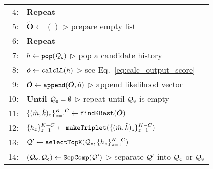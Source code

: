 \documentclass[11pt]{article}
\begin{document}
\begin{figure}[t]
\begin{tabular}{rp{71mm}}
      \\
  4:&\hspace{0.0em}
      \textbf{Repeat} \\
  5:&\hspace{3.0mm}
      $\tilde{\bm{O}} \leftarrow () $
      \hspace{\fill}$\triangleright$ {\scriptsize prepare empty list}
      \\
  6:&\hspace{3.0mm}
      \textbf{Repeat} \\
  7:&\hspace{6.0mm}
      $h \leftarrow {\tt pop}({\cal Q}_{\tt w})$
      \hspace{\fill}$\triangleright$ {\scriptsize pop a candidate history}
      \\
  8:&\hspace{6.0mm}
      $\tilde{\bm{o}} \leftarrow {\tt calcLL}(h)$
      \hspace{\fill}$\triangleright$ {\scriptsize see Eq.~\ref{eq:calc_output_score} }
      \\
  9:&\hspace{6.0mm}
      $\tilde{\bm{O}} \leftarrow {\tt append}(\tilde{\bm{O}},\tilde{\bm{o}})$
      \hspace{\fill}$\triangleright$ {\scriptsize append likelihood vector}
      \\
  10:&\hspace{3.0mm}
      \textbf{Until} ${\cal Q}_{\tt w} = \emptyset$
      \hspace{\fill}$\triangleright$ {\scriptsize repeat until ${\cal Q}_{\tt w}$ is empty}
      \\
  11:&\hspace{3.0mm}
      $\{(\hat{m},\hat{k})_{z}\}^{K-C}_{z=1} \leftarrow {\tt findKBest}(\tilde{\bm{O}})$
      \\
  12:&\hspace{3.0mm}
      $\{h_{z}\}^{K-C}_{z=1} \leftarrow {\tt makeTriplet}(\{(\hat{m},\hat{k})_{z}\}_{z=1}^{K-C} ) $
      \\
  13:&\hspace{3.0mm}
      ${\cal Q}' \leftarrow {\tt selectTopK}({\cal Q}_{\tt c}, \{h_{z}\}_{z=1}^{K-C}) $
      \\
  14:&\hspace{3.0mm}
      $({\cal Q}_{\tt w}, {\cal Q}_{\tt c}) \leftarrow {\tt SepComp}({\cal Q}') $
      \hspace{\fill}$\triangleright$ {\scriptsize separate ${\cal Q}'$ into ${\cal Q}_{\tt c}$ or ${\cal Q}_{\tt w}$}

\end{tabular}
\end{figure}
\end{document}
